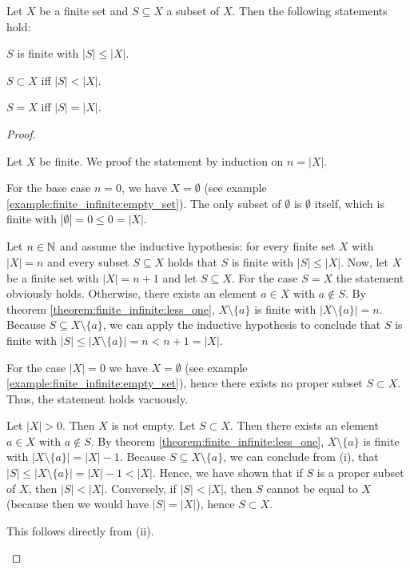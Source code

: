 \begin{theorem}\label{theorem:finite_infinite:subsets_finite}
    Let $X$ be a finite set and $S\subseteq X$ a subset of $X$. Then the following statements hold:
    \begin{intheoremenumerate}
        \item $S$ is finite with $|S|\leq |X|$.
        \item\label{theorem:finite_infinite:proper_subset} $S\subset X$ iff $|S|<|X|$.
        \item $S=X$ iff $|S|=|X|$.
    \end{intheoremenumerate}
\end{theorem}

\begin{proof}
    \begin{proofenumerate}
        \item Let $X$ be finite. We proof the statement by induction on $n=|X|$.
        
         For the base case $n=0$, we have $X=\emptyset$ (see example \ref{example:finite_infinite:empty_set}). The only subset of $\emptyset$ is $\emptyset$ itself, which is finite with $|\emptyset|=0\leq 0=|X|$.
        
         Let $n\in\mathbb{N}$ and assume the inductive hypothesis: for every finite set $X$ with $|X|=n$ and every subset $S\subseteq X$ holds that $S$ is finite with $|S|\leq |X|$. Now, let $X$ be a finite set with $|X|=n+1$ and let $S\subseteq X$. For the case $S=X$ the statement obviously holds. Otherwise, there exists an element $a\in X$ with $a\notin S$. By theorem \ref{theorem:finite_infinite:less_one}, $X\setminus\{a\}$ is finite with $|X\setminus\{a\}|=n$. Because $S\subseteq X\setminus\{a\}$, we can apply the inductive hypothesis to conclude that $S$ is finite with $|S|\leq |X\setminus\{a\}|=n< n+1=|X|$.

        \item For the case $|X|=0$ we have $X=\emptyset$ (see example \ref{example:finite_infinite:empty_set}), hence there exists no proper subset $S\subset X$. Thus, the statement holds vacuously.

        Let $|X|>0$. Then $X$ is not empty. Let $S\subset X$. Then there exists an element $a\in X$ with $a\notin S$. By theorem \ref{theorem:finite_infinite:less_one}, $X\setminus\{a\}$ is finite with $|X\setminus\{a\}|=|X|-1$. Because $S\subseteq X\setminus\{a\}$, we can conclude from (i), that $|S|\leq|X\setminus\{a\}|=|X|-1<|X|$. Hence, we have shown that if $S$ is a proper subset of $X$, then $|S|<|X|$. Conversely, if $|S|<|X|$, then $S$ cannot be equal to $X$ (because then we would have $|S|=|X|$), hence $S\subset X$.

        \item This follows directly from (ii).
    \end{proofenumerate}
\end{proof}

